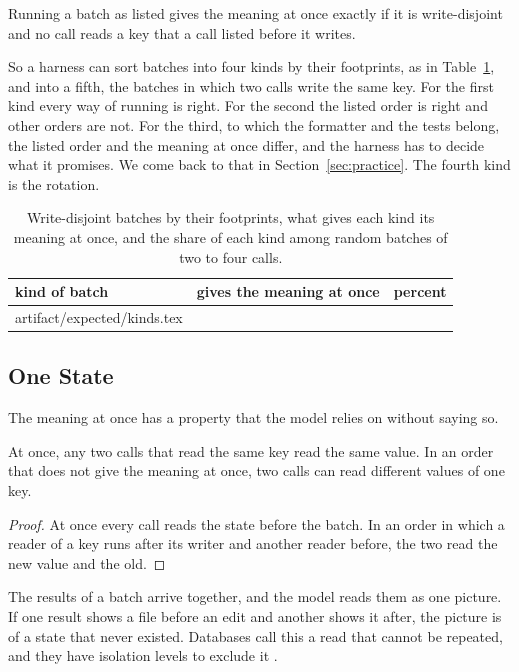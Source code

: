 \documentclass[acmsmall,nonacm,screen]{acmart}
\makeatletter
\newcommand{\rows}[1]{\@@input artifact/expected/#1.tex }
\makeatother
\begin{document}
\begin{corollary}\label{cor:listed}
Running a batch as listed gives the meaning at once exactly if it is write-disjoint and no
call reads a key that a call listed before it writes.
\end{corollary}

So a harness can sort batches into four kinds by their footprints, as in
Table~\ref{tab:kinds}, and into a fifth, the batches in which two calls write the same key.
For the first kind every way of running is right. For the second the listed order is right
and other orders are not. For the third, to which the formatter and the tests belong, the
listed order and the meaning at once differ, and the harness has to decide what it promises.
We come back to that in Section~\ref{sec:practice}. The fourth kind is the rotation.

\begin{table}
\caption{Write-disjoint batches by their footprints, what gives each kind its meaning at
once, and the share of each kind among \exBatches{} random batches of two to four
calls.}\label{tab:kinds}
\begin{tabular}{llr}
\toprule
kind of batch & gives the meaning at once & percent \\
\midrule
\rows{kinds}
\bottomrule
\end{tabular}
\end{table}

\subsection{One State}

The meaning at once has a property that the model relies on without saying so.

\begin{proposition}\label{prop:state}
At once, any two calls that read the same key read the same value. In an order that does not
give the meaning at once, two calls can read different values of one key.
\end{proposition}

\begin{proof}
At once every call reads the state before the batch. In an order in which a reader of a key
runs after its writer and another reader before, the two read the new value and the old.
\end{proof}

The results of a batch arrive together, and the model reads them as one picture. If one
result shows a file before an edit and another shows it after, the picture is of a state
that never existed. Databases call this a read that cannot be repeated, and they have
isolation levels to exclude it \citep{Berenson1995}.
\end{document}
